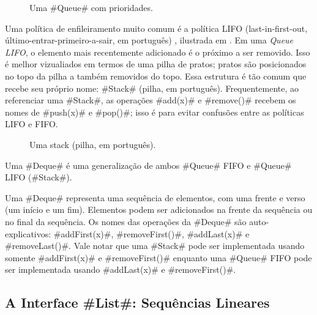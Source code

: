 \begin{figure}
  \caption[Uma fila com prioridades (no inglês, priority queue)]{Uma #Queue# com prioridades.}
\end{figure}


Uma política de enfileiramento muito comum é a política LIFO (last-in-first-out, último-entrar-primeiro-a-sair, em português)
%
%
%
%
%
%
, ilustrada em . Em uma \emph{Queue LIFO},
o elemento mais recentemente adicionado é o próximo a ser removido. 
Isso é melhor vizualiados em termos de uma pilha de pratos; pratos são 
posicionados no topo da pilha a também removidos do topo. Essa estrutura
é tão comum que recebe seu próprio nome: #Stack# (pilha, em português). Frequentemente, ao referenciar uma #Stack#, as operações #add(x)# e #remove()# 
recebem os nomes de #push(x)# e #pop()#; isso é para evitar confusões entre as políticas LIFO e FIFO.

\begin{figure}
  \caption[Uma stack (pilha, em português]{Uma stack (pilha, em português).}
\end{figure}


Uma #Deque#
%
é uma generalização de ambos #Queue# FIFO e #Queue# LIFO (#Stack#).

Uma #Deque# representa uma sequência de elementos, com uma frente e verso (um início e um fim). 
Elementos podem ser adicionados na frente da sequência ou no final da sequência.
Os nomes das operações da #Deque# são auto-explicativos: 
#addFirst(x)#, #removeFirst()#, #addLast(x)# e #removeLast()#.  
Vale notar que uma #Stack# pode ser implementada usando somente #addFirst(x)#
e #removeFirst()# enquanto uma #Queue# FIFO pode ser implementada usando 
#addLast(x)# e #removeFirst()#.

\subsection{A Interface #List#: Sequências Lineares}

